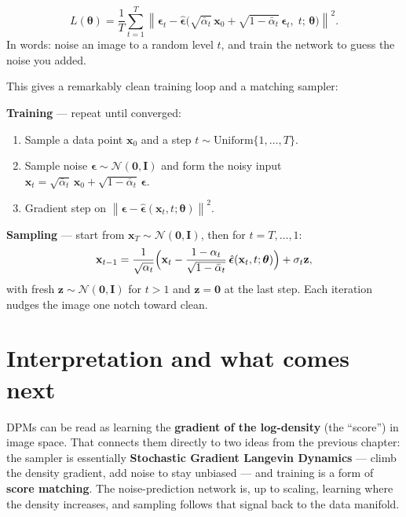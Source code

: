 \documentclass[11pt, oneside]{book}
\newcommand{\norm}[1]{\left\lVert #1 \right\rVert}
\newcommand{\eye}{\mathbf{I}}
\newcommand{\zeros}{\mathbf{0}}
\newcommand{\params}{\boldsymbol{\theta}}
\newcommand{\xvec}{\mathbf{x}}
\newcommand{\zvec}{\mathbf{z}}
\newcommand{\Normal}{\mathcal{N}}
\begin{document}
\begin{thmbox}[title={DDPM training objective}]
\[
  L(\params) = \frac1T \sum_{t=1}^{T}
    \norm{\boldsymbol{\epsilon}_t -
          \hat{\boldsymbol{\epsilon}}\bigl(\sqrt{\bar{\alpha}_t}\,\xvec_0
          + \sqrt{1-\bar{\alpha}_t}\,\boldsymbol{\epsilon}_t,\; t;\,\params\bigr)}^2 .
\]
In words: noise an image to a random level $t$, and train the network to guess the
noise you added.
\end{thmbox}

This gives a remarkably clean training loop and a matching sampler:

\begin{exbox}[title={Training and sampling (DDPM)}]
\textbf{Training} --- repeat until converged:
\begin{enumerate}
  \item Sample a data point $\xvec_0$ and a step $t\sim\mathrm{Uniform}\{1,\dots,T\}$.
  \item Sample noise $\boldsymbol{\epsilon}\sim\Normal(\zeros,\eye)$ and form the
        noisy input $\xvec_t = \sqrt{\bar{\alpha}_t}\,\xvec_0 + \sqrt{1-\bar{\alpha}_t}\,\boldsymbol{\epsilon}$.
  \item Gradient step on $\norm{\boldsymbol{\epsilon} - \hat{\boldsymbol{\epsilon}}(\xvec_t,t;\params)}^2$.
\end{enumerate}
\textbf{Sampling} --- start from $\xvec_T\sim\Normal(\zeros,\eye)$, then for
$t = T,\dots,1$:
\[
  \xvec_{t-1} = \frac{1}{\sqrt{\alpha_t}}\Bigl(\xvec_t
    - \frac{1-\alpha_t}{\sqrt{1-\bar{\alpha}_t}}\,\hat{\boldsymbol{\epsilon}}(\xvec_t,t;\params)\Bigr)
    + \sigma_t \zvec,
\]
with fresh $\zvec\sim\Normal(\zeros,\eye)$ for $t>1$ and $\zvec=\zeros$ at the last
step. Each iteration nudges the image one notch toward clean.
\end{exbox}

\section{Interpretation and what comes next}

DPMs can be read as learning the \textbf{gradient of the log-density} (the
``score'') in image space. That connects them directly to two ideas from the
previous chapter: the sampler is essentially \textbf{Stochastic Gradient Langevin
Dynamics} --- climb the density gradient, add noise to stay unbiased --- and
training is a form of \textbf{score matching}. The noise-prediction network is, up
to scaling, learning where the density increases, and sampling follows that signal
back to the data manifold.
\end{document}
